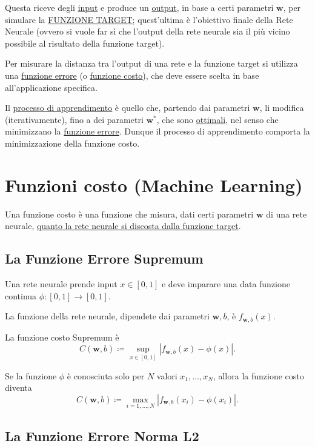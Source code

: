 \documentclass[10pt]{book}
\newcommand{\1}{\mathds{1}}
\theoremstyle{definition}%
\theoremstyle{plain}
\theoremstyle{remark}
\begin{document}
Questa riceve degli \uline{input} e produce un \uline{output}, in base a certi parametri \(\bm{w}\), per simulare la \uline{FUNZIONE TARGET}; quest'ultima è l'obiettivo finale della Rete Neurale (ovvero si vuole far sì che l'output della rete neurale sia il più vicino possibile al risultato della funzione target).

Per misurare la distanza tra l'output di una rete e la funzione target si utilizza una \uline{funzione errore} (o \uline{funzione costo}), che deve essere scelta in base all'applicazione specifica.

Il \uline{\hyperref[sec:org933f778]{processo di apprendimento}} è quello che, partendo dai parametri \(\bm{w}\), li modifica (iterativamente), fino a dei parametri \(\bm{w}^{*}\), che sono \uline{ottimali}, nel senso che minimizzano la \uline{funzione errore}. Dunque il processo di apprendimento comporta la minimizzazione della funzione costo.
\section{Funzioni costo (Machine Learning)}
\label{sec:orgf94918a}
Una funzione costo è una funzione che misura, dati certi parametri \(\bm{w}\) di una rete neurale, \uline{quanto la rete neurale si discosta dalla funzione target}.
\subsection{La Funzione Errore Supremum}
\label{sec:orgfa04425}

Una rete neurale prende input \(x \in [0,1]\) e deve imparare una data funzione continua \(\phi:[0,1]\to [0,1]\).

La funzione della rete neurale, dipendete dai parametri \(\bm{w},b\), è \(f_{\bm{w},b}(x)\).

La funzione costo Supremum è
\begin{equation*}
C(\bm{w},b) \coloneqq \sup_{x \in [0,1]}|f_{\bm{w},b}(x)-\phi(x)|.
\end{equation*}

Se la funzione \(\phi\) è conosciuta solo per \(N\) valori \(x_{1},\dots,x_{N}\), allora la funzione costo diventa
\begin{equation*}
C(\bm{w},b) \coloneqq \max_{i=1,\dots, N} |f_{\bm{w},b}(x_{i})-\phi(x_{i})|.
\end{equation*}
\subsection{La Funzione Errore Norma L2}
\label{sec:orgfcb8e21}
\end{document}
